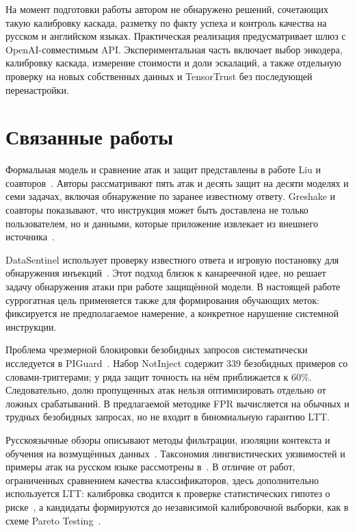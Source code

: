 \documentclass{misisarticle}
\begin{document}
На момент подготовки работы автором не обнаружено решений, сочетающих такую калибровку каскада, разметку по факту успеха и контроль качества на русском и английском языках. Практическая реализация предусматривает шлюз с OpenAI-совместимым API. Экспериментальная часть включает выбор энкодера, калибровку каскада, измерение стоимости и доли эскалаций, а также отдельную проверку на новых собственных данных и TensorTrust без последующей перенастройки.

\section{Связанные работы}

Формальная модель и сравнение атак и защит представлены в работе Liu и соавторов~\cite{liu2024}. Авторы рассматривают пять атак и десять защит на десяти моделях и семи задачах, включая обнаружение по заранее известному ответу. Greshake и соавторы показывают, что инструкция может быть доставлена не только пользователем, но и данными, которые приложение извлекает из внешнего источника~\cite{greshake2023}.

DataSentinel использует проверку известного ответа и игровую постановку для обнаружения инъекций~\cite{liu2025datasentinel}. Этот подход близок к канареечной идее, но решает задачу обнаружения атаки при работе защищённой модели. В настоящей работе суррогатная цель применяется также для формирования обучающих меток: фиксируется не предполагаемое намерение, а конкретное нарушение системной инструкции.

Проблема чрезмерной блокировки безобидных запросов систематически исследуется в PIGuard~\cite{li2025piguard}. Набор NotInject содержит 339 безобидных примеров со словами-триггерами; у ряда защит точность на нём приближается к 60\%. Следовательно, долю пропущенных атак нельзя оптимизировать отдельно от ложных срабатываний. В предлагаемой методике FPR вычисляется на обычных и трудных безобидных запросах, но не входит в биномиальную гарантию LTT.

Русскоязычные обзоры описывают методы фильтрации, изоляции контекста и обучения на возмущённых данных~\cite{mudarova2024, velichko2025}. Таксономия лингвистических уязвимостей и примеры атак на русском языке рассмотрены в~\cite{zyryanova2024}. В отличие от работ, ограниченных сравнением качества классификаторов, здесь дополнительно используется LTT: калибровка сводится к проверке статистических гипотез о риске~\cite{angelopoulos2025}, а кандидаты формируются до независимой калибровочной выборки, как в схеме Pareto Testing~\cite{laufer2023}.
\end{document}
